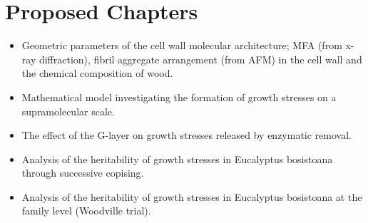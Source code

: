 \section{Proposed Chapters}
\begin{itemize}
\item Geometric parameters of the cell wall molecular architecture; MFA (from x-ray
diffraction), fibril aggregate arrangement (from AFM) in the  cell wall and the
chemical composition of wood.
\end{itemize}

\begin{itemize}
\item Mathematical model investigating the formation of growth stresses on a
supramolecular scale.
\end{itemize}

\begin{itemize}
\item The effect of the G-layer on growth stresses released by enzymatic removal.
\end{itemize}
\begin{itemize}
\item Analysis of the heritability of growth stresses in Eucalyptus bosistoana through
successive copising.
\end{itemize}

\begin{itemize}
\item Analysis of the heritability of growth stresses in Eucalyptus bosistoana at the
family level (Woodville trial).
\end{itemize}

